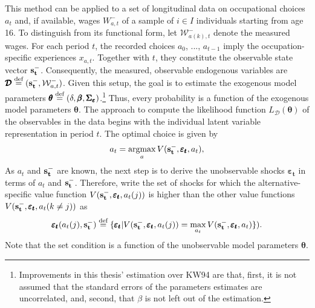 This method can be applied to a set of longitudinal data on occupational choices $a_t$ and, if available, wages $W_{a,t}^{-}$ of a sample of $i \in I$ individuals starting from age 16. To distinguish from its functional form, let $\mathcal{W}^{-}_{a(k),t}$ denote the measured wages. For each period $t$, the recorded choices $a_0$, ..., $a_{t-1}$  imply the occupation-specific experiences $x_{a,t}$. Together with $t$, they constitute the observable state vector $\bold{s_t^-}$. Consequently, the measured, observable endogenous variables are $\pmb{\mathcal{D}}\stackrel{\text{def}}{=}(\bold{s_t^-},\mathcal{W}^{-}_{a,t})$. Given this setup, the goal is to estimate the exogenous model parameters $\pmb{\theta}\stackrel{\text{def}}{=}(\delta, \pmb{\beta}, \pmb{\Sigma_\varepsilon})$.\footnote{Improvements in this thesis' estimation over KW94 are that, first, it is not assumed that the standard errors of the parameters estimates are uncorrelated, and, second, that $\beta$ is not left out of the estimation.} Thus, every probability is a function of the exogenous model parameters $\pmb{\theta}$.
The approach to compute the likelihood function $L_{\pmb{\mathcal{D}}}(\pmb{\theta})$ of the observables in the data begins with the individual latent variable representation in period $t$. The optimal choice is given by
\begin{align}
a_t = \operatorname*{argmax}_a V(\bold{s_t^-},\pmb{\varepsilon_t},a_t),
\end{align}
As $a_t$ and $\bold{s_t^-}$ are known, the next step is to derive the unobservable shocks $\pmb{\varepsilon_t}$ in terms of $a_t$ and $\bold{s_t^-}$. Therefore, write the set of shocks for which the alternative-specific value function $V(\bold{s_t^-},\pmb{\varepsilon_t},a_t(j))$ is higher than the other value functions $V(\bold{s_t^-},\pmb{\varepsilon_t},a_t(k\neq j))$ as
\begin{align}
\pmb{\varepsilon_t}(a_t(j),\bold{s_t^-}) \stackrel{\text{def}}{=} \{\pmb{\varepsilon_t}|V(\bold{s_t^-},\pmb{\varepsilon_t},a_t(j)) = \max_{a_t} V(\bold{s_t^-},\pmb{\varepsilon_t},a_t)\}).
\end{align}
Note that the set condition is a function of the unobservable model parameters $\pmb{\theta}$.

